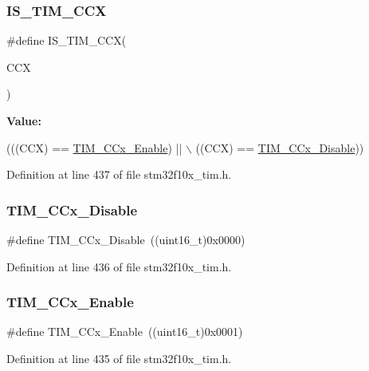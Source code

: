 \subsubsection{\texorpdfstring{I\+S\+\_\+\+T\+I\+M\+\_\+\+C\+CX}{IS\_TIM\_CCX}}
{\footnotesize\ttfamily \#define I\+S\+\_\+\+T\+I\+M\+\_\+\+C\+CX(\begin{DoxyParamCaption}\item[{}]{C\+CX }\end{DoxyParamCaption})}

{\bfseries Value\+:}
\begin{DoxyCode}
(((CCX) == \hyperlink{group___t_i_m___capture___compare__state_ga6acaeb60dad50ce9799ae9f62ed7719a}{TIM\_CCx\_Enable}) || \(\backslash\)
                         ((CCX) == \hyperlink{group___t_i_m___capture___compare__state_gaa1441f66393b9daa9f97efb29b364cd3}{TIM\_CCx\_Disable}))
\end{DoxyCode}


Definition at line 437 of file stm32f10x\+\_\+tim.\+h.

\mbox{\label{group___t_i_m___capture___compare__state_gaa1441f66393b9daa9f97efb29b364cd3}} 
\subsubsection{\texorpdfstring{T\+I\+M\+\_\+\+C\+Cx\+\_\+\+Disable}{TIM\_CCx\_Disable}}
{\footnotesize\ttfamily \#define T\+I\+M\+\_\+\+C\+Cx\+\_\+\+Disable~((uint16\+\_\+t)0x0000)}



Definition at line 436 of file stm32f10x\+\_\+tim.\+h.

\mbox{\label{group___t_i_m___capture___compare__state_ga6acaeb60dad50ce9799ae9f62ed7719a}} 
\subsubsection{\texorpdfstring{T\+I\+M\+\_\+\+C\+Cx\+\_\+\+Enable}{TIM\_CCx\_Enable}}
{\footnotesize\ttfamily \#define T\+I\+M\+\_\+\+C\+Cx\+\_\+\+Enable~((uint16\+\_\+t)0x0001)}



Definition at line 435 of file stm32f10x\+\_\+tim.\+h.

